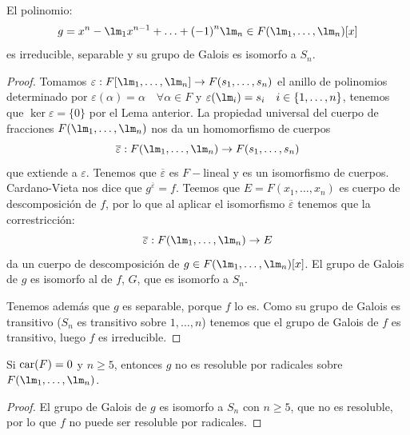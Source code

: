\begin{prop}
    El polinomio:
    \begin{equation*}
        g = x^n - \lm_1 x^{n-1} + \ldots + {(-1)}^{n} \lm_n \in F(\lm_1,\ldots,\lm_n)[x]
    \end{equation*}
    es irreducible, separable y su grupo de Galois es isomorfo a $S_n$.
    \begin{proof}
        Tomamos $\varepsilon:F[\lm_1,\ldots,\lm_n]\to F(s_1,\ldots, s_n)$ el anillo de polinomios determinado por $\varepsilon(\alpha) = \alpha\quad \forall \alpha\in F$ y $\varepsilon(\lm_i) = s_i\quad  i \in \{1,\ldots,n\}$, tenemos que $\ker\varepsilon = \{0\}$ por el Lema anterior. La propiedad universal del cuerpo de fracciones $F(\lm_1,\ldots,\lm_n)$ nos da un homomorfismo de cuerpos
        \begin{equation*}
            \overline{\varepsilon} :F(\lm_1,\ldots,\lm_n) \to F(s_1,\ldots,s_n)
        \end{equation*}
        que extiende a $\varepsilon$. Tenemos que $\overline{\varepsilon}$ es $F-$lineal y es un isomorfismo de cuerpos. Cardano-Vieta nos dice que $g^{\overline{\varepsilon}} = f$. Teemos que $E = F(x_1,\ldots,x_n)$ es cuerpo de descomposición de $f$, por lo que al aplicar el isomorfismo $\overline{\varepsilon}$ tenemos que  la correstricción:
        \begin{equation*}
            \overline{\varepsilon}:F(\lm_1,\ldots,\lm_n) \to E
        \end{equation*}
        da un cuerpo de descomposición de $g\in F(\lm_1,\ldots,\lm_n)[x]$. El grupo de Galois de $g$ es isomorfo al de $f$, $G$, que es isomorfo a $S_n$.

        \noindent
        Tenemos además que $g$ es separable, porque $f$ lo es. Como su grupo de Galois es transitivo ($S_n$ es transitivo sobre $1,\ldots,n$) tenemos que el grupo de Galois de $f$ es transitivo, luego $f$ es irreducible.
    \end{proof}
\end{prop}

\begin{teo}
    Si $\operatorname{car}(F) = 0$ y $n\geq 5$, entonces $g$ no es resoluble por radicales sobre $F(\lm_1,\ldots,\lm_n)$.
    \begin{proof}
        El grupo de Galois de $g$ es isomorfo a $S_n$ con $n\geq 5$, que no es resoluble, por lo que $f$ no puede ser resoluble por radicales.
    \end{proof}
\end{teo}


